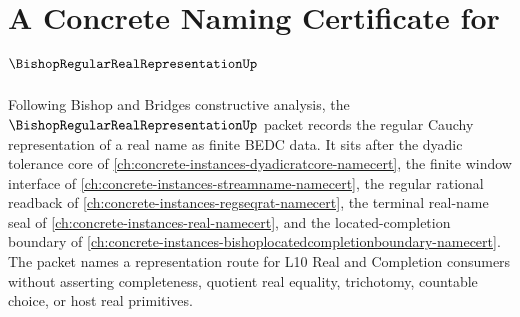 \chapter{A Concrete Naming Certificate for $\BishopRegularRealRepresentationUp$}
\label{ch:concrete-instances-bishop-regular-real-representation-namecert}

Following Bishop and Bridges constructive analysis, the $\BishopRegularRealRepresentationUp$ packet records the regular Cauchy representation of a real name as finite BEDC data. It sits after the dyadic tolerance core of \autoref{ch:concrete-instances-dyadicratcore-namecert}, the finite window interface of \autoref{ch:concrete-instances-streamname-namecert}, the regular rational readback of \autoref{ch:concrete-instances-regseqrat-namecert}, the terminal real-name seal of \autoref{ch:concrete-instances-real-namecert}, and the located-completion boundary of \autoref{ch:concrete-instances-bishoplocatedcompletionboundary-namecert}. The packet names a representation route for L10 Real and Completion consumers without asserting completeness, quotient real equality, trichotomy, countable choice, or host real primitives.

